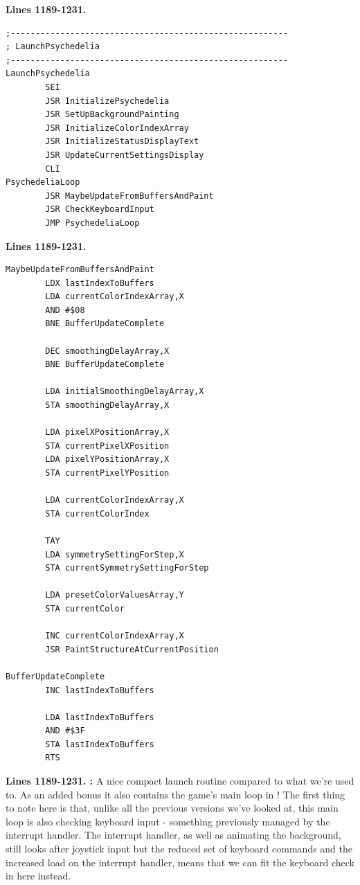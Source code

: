 

\clearpage
\textbf{Lines 1189-1231. } 
\begin{lstlisting}
;--------------------------------------------------------
; LaunchPsychedelia
;--------------------------------------------------------
LaunchPsychedelia
        SEI 
        JSR InitializePsychedelia
        JSR SetUpBackgroundPainting
        JSR InitializeColorIndexArray
        JSR InitializeStatusDisplayText
        JSR UpdateCurrentSettingsDisplay
        CLI 
PsychedeliaLoop   
        JSR MaybeUpdateFromBuffersAndPaint
        JSR CheckKeyboardInput
        JMP PsychedeliaLoop
\end{lstlisting}
\textbf{Lines 1189-1231. } 
\begin{lstlisting}[basicstyle=\ttfamily\scriptsize, caption=The routine responsible for painting patterns.]
MaybeUpdateFromBuffersAndPaint   
        LDX lastIndexToBuffers
        LDA currentColorIndexArray,X
        AND #$08
        BNE BufferUpdateComplete

        DEC smoothingDelayArray,X
        BNE BufferUpdateComplete

        LDA initialSmoothingDelayArray,X
        STA smoothingDelayArray,X

        LDA pixelXPositionArray,X
        STA currentPixelXPosition
        LDA pixelYPositionArray,X
        STA currentPixelYPosition

        LDA currentColorIndexArray,X
        STA currentColorIndex

        TAY 
        LDA symmetrySettingForStep,X
        STA currentSymmetrySettingForStep

        LDA presetColorValuesArray,Y
        STA currentColor

        INC currentColorIndexArray,X
        JSR PaintStructureAtCurrentPosition

BufferUpdateComplete   
        INC lastIndexToBuffers

        LDA lastIndexToBuffers
        AND #$3F
        STA lastIndexToBuffers
        RTS 
\end{lstlisting}
\clearpage

\textbf{Lines 1189-1231. :} A nice compact launch routine compared to what we're used to. As an added
bonus it also contains the game's main loop in ! The first thing to note here is that, unlike all the previous
versions we've looked at, this main loop is also checking keyboard input - something previously managed by the interrupt handler. The
interrupt handler, as well as animating the background, still looks after joystick input but the reduced set of keyboard commands and
the increased load on the interrupt handler, means that we can fit the keyboard check in here instead.

